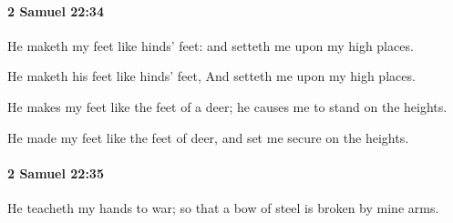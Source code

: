 		\paragraph{2 Samuel 22:34} %
			\label{2SAMUEL-22-34}

			He maketh my feet like hinds’ feet: and setteth me upon my high places.

			\begin{versebox}
					\item[BHS] 
					\item[ASV] He maketh his feet like hinds' feet, And setteth me upon my high places.
					\item[NIV] He makes my feet like the feet of a deer; he causes me to stand on the heights.
					\item[NRSV] He made my feet like the feet of deer, and set me secure on the heights.
			\end{versebox}

		\paragraph{2 Samuel 22:35} %
			\label{2SAMUEL-22-35}

			He teacheth my hands to war; so that a bow of steel is broken by mine arms.

